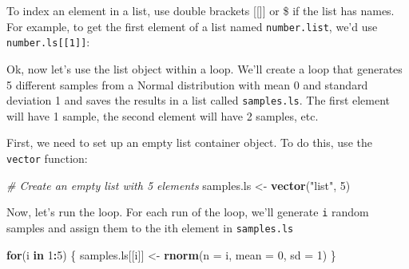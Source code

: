 \documentclass[]{book}
\newenvironment{Shaded}{\begin{snugshade}}{\end{snugshade}}
\newcommand{\KeywordTok}[1]{\textcolor[rgb]{0.13,0.29,0.53}{\textbf{#1}}}
\newcommand{\DataTypeTok}[1]{\textcolor[rgb]{0.13,0.29,0.53}{#1}}
\newcommand{\DecValTok}[1]{\textcolor[rgb]{0.00,0.00,0.81}{#1}}
\newcommand{\StringTok}[1]{\textcolor[rgb]{0.31,0.60,0.02}{#1}}
\newcommand{\CommentTok}[1]{\textcolor[rgb]{0.56,0.35,0.01}{\textit{#1}}}
\newcommand{\ControlFlowTok}[1]{\textcolor[rgb]{0.13,0.29,0.53}{\textbf{#1}}}
\newcommand{\OperatorTok}[1]{\textcolor[rgb]{0.81,0.36,0.00}{\textbf{#1}}}
\newcommand{\NormalTok}[1]{#1}
\theoremstyle{definition}
\theoremstyle{definition}
\theoremstyle{remark}
\begin{document}
To index an element in a list, use double brackets {[}{[}{]}{]} or \$ if
the list has names. For example, to get the first element of a list
named \texttt{number.list}, we'd use \texttt{number.ls{[}{[}1{]}{]}}:

\begin{Shaded}
\end{Shaded}

Ok, now let's use the list object within a loop. We'll create a loop
that generates 5 different samples from a Normal distribution with mean
0 and standard deviation 1 and saves the results in a list called
\texttt{samples.ls}. The first element will have 1 sample, the second
element will have 2 samples, etc.

First, we need to set up an empty list container object. To do this, use
the \texttt{vector} function:

\begin{Shaded}
\begin{Highlighting}[]
\CommentTok{# Create an empty list with 5 elements}
\NormalTok{samples.ls <-}\StringTok{ }\KeywordTok{vector}\NormalTok{(}\StringTok{"list"}\NormalTok{, }\DecValTok{5}\NormalTok{)}
\end{Highlighting}
\end{Shaded}

Now, let's run the loop. For each run of the loop, we'll generate
\texttt{i} random samples and assign them to the ith element in
\texttt{samples.ls}

\begin{Shaded}
\begin{Highlighting}[]
 \ControlFlowTok{for}\NormalTok{(i }\ControlFlowTok{in} \DecValTok{1}\OperatorTok{:}\DecValTok{5}\NormalTok{) \{}
\NormalTok{   samples.ls[[i]] <-}\StringTok{ }\KeywordTok{rnorm}\NormalTok{(}\DataTypeTok{n =}\NormalTok{ i, }\DataTypeTok{mean =} \DecValTok{0}\NormalTok{, }\DataTypeTok{sd =} \DecValTok{1}\NormalTok{)}
\NormalTok{ \}}
\end{Highlighting}
\end{Shaded}
\end{document}
